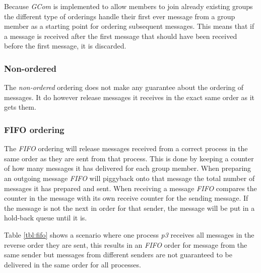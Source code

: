 \documentclass[titlepage, twocolumn, a4paper, 10pt]{article}
\begin{document}
Because \textit{GCom} is implemented to allow members to join already
existing groups the different type of orderings handle their first
ever message from a group member as a starting point for ordering
subsequent messages. This means that if a message is received after
the first message that should have been received before the first
message, it is discarded.

\subsubsection{Non-ordered}\label{sec:-non-ordered}
The \textit{non-ordered} ordering does not make any guarantee about
the ordering of messages. It do however release messages it receives
in the exact same order as it gets them.

\subsubsection{FIFO ordering}\label{sec:fifo}
The \textit{FIFO} ordering will release messages received from a
correct process in the same order as they are sent from that process.
This is done by keeping a counter of how many messages it has
delivered for each group member. When preparing an outgoing message
\textit{FIFO} will piggyback onto that message the total number of
messages it has prepared and sent. When receiving a message
\textit{FIFO} compares the counter in the message with its own receive
counter for the sending message. If the message is not the next in
order for that sender, the message will be put in a hold-back queue
until it is.

Table \ref{tbl:fifo} shows a scenario where one process \textit{p3}
receives all messages in the reverse order they are sent, this results
in an \textit{FIFO} order for message from the same sender but
messages from different senders are not guaranteed to be delivered in
the same order for all processes.
\end{document}
